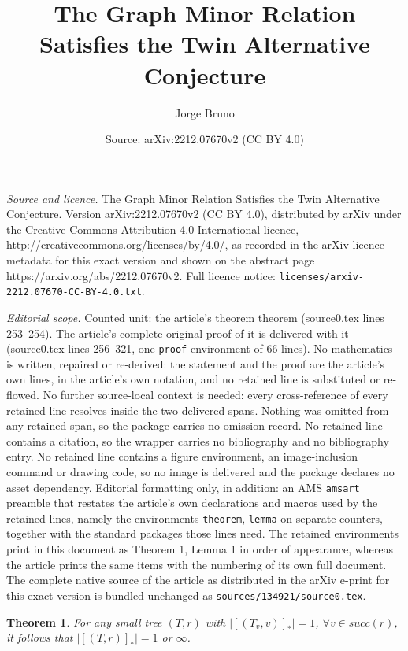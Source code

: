 \documentclass[10pt,a4paper]{amsart}
\title{The Graph Minor Relation Satisfies the Twin Alternative Conjecture}
\author{Jorge Bruno}
\date{Source: arXiv:2212.07670v2 (CC BY 4.0)}
\newtheorem{theorem}{Theorem}
\begin{document}
\maketitle

\noindent\emph{Source and licence.} The Graph Minor Relation Satisfies the Twin Alternative Conjecture. Version arXiv:2212.07670v2 (CC BY 4.0), distributed by arXiv under the Creative Commons Attribution 4.0 International licence, http://creativecommons.org/licenses/by/4.0/, as recorded in the arXiv licence metadata for this exact version and shown on the abstract page https://arxiv.org/abs/2212.07670v2. Full licence notice: \texttt{licenses/arxiv-2212.07670-CC-BY-4.0.txt}.\par\smallskip

\noindent\textit{Editorial scope.} Counted unit: the article's theorem theorem (source0.tex lines 253--254). The article's complete original proof of it is delivered with it (source0.tex lines 256--321, one \texttt{proof} environment of 66 lines). No mathematics is written, repaired or re-derived: the statement and the proof are the article's own lines, in the article's own notation, and no retained line is substituted or re-flowed.  No further source-local context is needed: every cross-reference of every retained line resolves inside the two delivered spans.  Nothing was omitted from any retained span, so the package carries no omission record.  No retained line contains a citation, so the wrapper carries no bibliography and no bibliography entry.  No retained line contains a figure environment, an image-inclusion command or drawing code, so no image is delivered and the package declares no asset dependency.  Editorial formatting only, in addition: an AMS \texttt{amsart} preamble that restates the article's own declarations and macros used by the retained lines, namely the environments \texttt{theorem}, \texttt{lemma} on separate counters, together with the standard packages those lines need.  The retained environments print in this document as Theorem 1, Lemma 1 in order of appearance, whereas the article prints the same items with the numbering of its own full document.  The complete native source of the article as distributed in the arXiv e-print for this exact version is bundled unchanged as \texttt{sources/134921/source0.tex}.
\begin{theorem} For any small tree $(T,r)$ with $|[(T_v, v)]_*| =1$, $\forall v \in succ(r)$, it follows that $|[(T,r)]_*| =1$ or $\infty$. 
\end{theorem}
\end{document}
